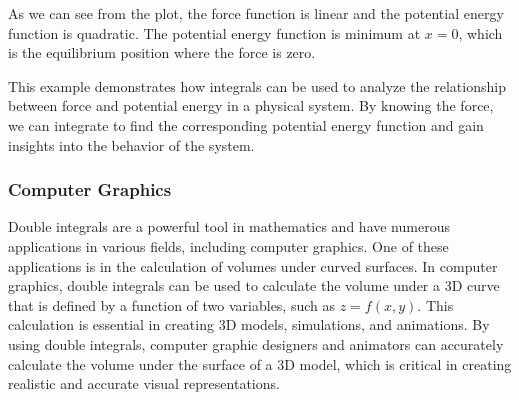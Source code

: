 \documentclass[13pt,a4paper]{report}
\begin{document}
As we can see from the plot, the force function is linear and the potential energy function is quadratic. The potential energy function is minimum at $x=0$, which is the equilibrium position where the force is zero.

This example demonstrates how integrals can be used to analyze the relationship between force and potential energy in a physical system. By knowing the force, we can integrate to find the corresponding potential energy function and gain insights into the behavior of the system.

\subsubsection{Computer Graphics}
Double integrals are a powerful tool in mathematics and have numerous applications in various fields, including computer graphics. One of these applications is in the calculation of volumes under curved surfaces. In computer graphics, double integrals can be used to calculate the volume under a 3D curve that is defined by a function of two variables, such as $z = f(x, y)$. This calculation is essential in creating 3D models, simulations, and animations. By using double integrals, computer graphic designers and animators can accurately calculate the volume under the surface of a 3D model, which is critical in creating realistic and accurate visual representations.
\end{document}
